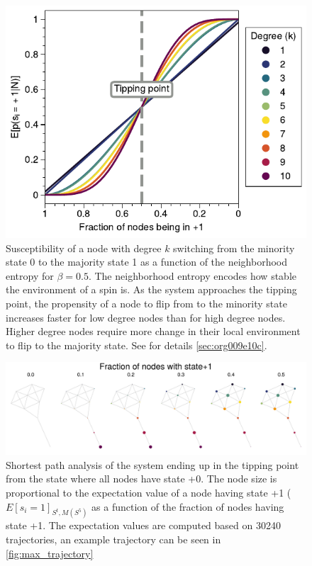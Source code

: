 \documentclass[a4paper, 11pt, twocolumn]{article}
\begin{document}
\begin{figure}[htbp]
\centering
\includegraphics[width=.9\linewidth]{./figures/fig_majority_flip.pdf}
\caption{\label{fig:maj_flip}Susceptibility of a node with degree $k$ switching from the minority state 0 to the majority state 1 as a function of the neighborhood entropy for $\beta = 0.5$. The neighborhood entropy encodes how stable the environment of a spin is. As the system approaches the tipping point, the propensity of a node to flip from to the minority state increases faster for low degree nodes than for high degree nodes. Higher degree nodes require more change in their local environment to flip to the majority state. See for details \ref{sec:org009e10c}.}
\end{figure}


\begin{figure}[htbp]
\centering
\includegraphics[width=.9\linewidth]{./figures/expectation_kite.pdf}
\caption{\label{fig:expectation_kite} Shortest path analysis of the system ending up in the tipping point from the state where all nodes have state +0. The node size is proportional to the expectation value of a node having state +1  ($E[s_i = 1]_{S^t, M(S^5)}$ as a function of the fraction of nodes having state +1. The expectation values are computed based on 30240 trajectories, an example trajectory can be seen in \cref{fig:max_trajectory}
}
\end{figure}
\end{document}
